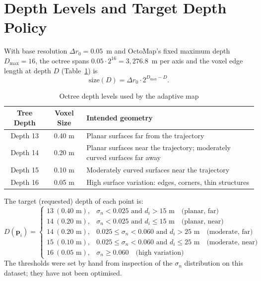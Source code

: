 \documentclass[11pt,a4paper]{report}
\begin{document}
\section{Depth Levels and Target Depth Policy}
With base resolution $\Delta r_0 = 0.05$~m and OctoMap's fixed maximum depth $D_{\max} = 16$, the octree spans $0.05 \cdot 2^{16} = 3{,}276.8$~m per axis and the voxel edge length at depth $D$ (Table~\ref{tab:depth_levels}) is
\begin{equation}
    \text{size}(D) = \Delta r_0 \cdot 2^{D_{\max} - D}.
\end{equation}

\begin{table}[H]
    \centering
    \caption{Octree depth levels used by the adaptive map}
    \label{tab:depth_levels}
    \vspace{2mm}
    \begin{tabular}{ccl}
        \toprule
        \textbf{Tree Depth} & \textbf{Voxel Size} & \textbf{Intended geometry} \\
        \midrule
        Depth 13 & 0.40 m & Planar surfaces far from the trajectory \\
        Depth 14 & 0.20 m & Planar surfaces near the trajectory; moderately curved surfaces far away \\
        Depth 15 & 0.10 m & Moderately curved surfaces near the trajectory \\
        Depth 16 & 0.05 m & High surface variation: edges, corners, thin structures \\
        \bottomrule
    \end{tabular}
\end{table}

The target (requested) depth of each point is:
\begin{equation}
    D(\mathbf{p}_i) = \begin{cases}
        13 \ (0.40\text{ m}), & \sigma_n < 0.025 \text{ and } d_i > 15\text{ m} \quad \text{(planar, far)} \\
        14 \ (0.20\text{ m}), & \sigma_n < 0.025 \text{ and } d_i \le 15\text{ m} \quad \text{(planar, near)} \\
        14 \ (0.20\text{ m}), & 0.025 \le \sigma_n < 0.060 \text{ and } d_i > 25\text{ m} \quad \text{(moderate, far)} \\
        15 \ (0.10\text{ m}), & 0.025 \le \sigma_n < 0.060 \text{ and } d_i \le 25\text{ m} \quad \text{(moderate, near)} \\
        16 \ (0.05\text{ m}), & \sigma_n \ge 0.060 \quad \text{(high variation)}
    \end{cases}
    \label{eq:policy}
\end{equation}
The thresholds were set by hand from inspection of the $\sigma_n$ distribution on this dataset; they have not been optimised.
\end{document}
